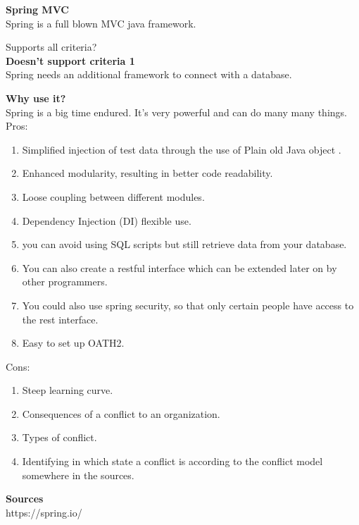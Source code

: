 \textbf{Spring MVC} \\
Spring is a full blown MVC java framework.

Supports all criteria? \\
\textbf{Doesn't support criteria 1}\\
Spring needs an additional framework  to connect with a database.

\textbf{Why use it?}\\
Spring is a big time endured. It's very powerful and can do many many things.\\

Pros:
\begin{enumerate}
	\item Simplified injection of test data through the use of Plain old Java object .
	\item Enhanced modularity, resulting in better code readability.
	\item Loose coupling between different modules.
	\item Dependency Injection (DI) flexible use.
	\item you can avoid using SQL scripts but still retrieve data from your database.
	\item You can also create a restful interface which can be extended later on by other programmers.
	\item You could also use spring security, so that only certain people have access to the rest interface.
	\item Easy to set up OATH2. 
\end{enumerate}
Cons:
\begin{enumerate}
	\item Steep learning curve.
	\item Consequences of a conflict to an organization.
	\item Types of conflict.
	\item Identifying in which state a conflict is according to the conflict model somewhere in the sources.
\end{enumerate}

\textbf{Sources}\\
https://spring.io/